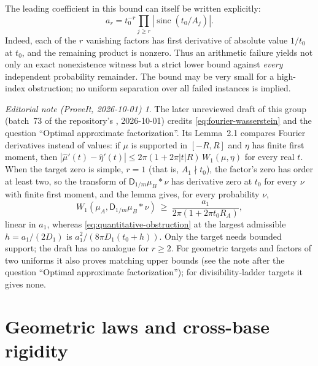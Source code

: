 \documentclass[11pt,a4paper]{article}
\theoremstyle{definition}
\theoremstyle{remark}
\newtheorem*{ednotethird}{Editorial note (ProveIt, 2026-10-01)}
\newcommand{\sinc}{\operatorname{sinc}}
\newcommand{\D}{\mathsf D}
\begin{document}
The leading coefficient in this bound can itself be written explicitly:
\begin{equation}\label{eq:leading-coefficient}
 a_r=t_0^{-r}\prod_{j\ge r}|\sinc(t_0/A_j)|.
\end{equation}
Indeed, each of the $r$ vanishing factors has first derivative of absolute
value $1/t_0$ at $t_0$, and the remaining product is nonzero. Thus an
arithmetic failure yields not only an exact nonexistence witness but a
strict lower bound against \emph{every} independent probability remainder.
The bound may be very small for a high-index obstruction; no uniform
separation over all failed instances is implied.
\begin{ednotethird}
The later unreviewed draft
of this group (batch~73 of the repository's ,
2026-10-01) credits \eqref{eq:fourier-wasserstein} and the question
``Optimal approximate factorization''. Its Lemma~2.1 compares Fourier
derivatives instead of values: if $\mu$ is supported in $[-R,R]$ and
$\eta$ has finite first moment, then
$|\widehat\mu{}'(t)-\widehat\eta{}'(t)|\le2\pi(1+2\pi|t|R)\,W_1(\mu,\eta)$
for every real $t$. When the target zero is simple, $r=1$ (that is,
$A_1\nmid t_0$), the factor's zero has order at least two, so the
transform of $\D_{1/m}\mu_B*\nu$ has derivative zero at $t_0$ for every
$\nu$ with finite first moment, and the lemma gives, for every
probability $\nu$,
\[
 W_1(\mu_A,\D_{1/m}\mu_B*\nu)\ \ge\ \frac{a_1}{2\pi(1+2\pi t_0R_A)},
\]
linear in $a_1$, whereas \eqref{eq:quantitative-obstruction} at the
largest admissible $h=a_1/(2D_1)$ is $a_1^2/(8\pi D_1(t_0+h))$. Only the
target needs bounded support; the draft has no analogue for $r\ge2$. For
geometric targets and factors of two uniforms it also proves matching
upper bounds (see the note after the question ``Optimal approximate
factorization''); for divisibility-ladder targets it gives none.
\end{ednotethird}

\section{Geometric laws and cross-base rigidity}
\label{sec:geometric}
\end{document}
